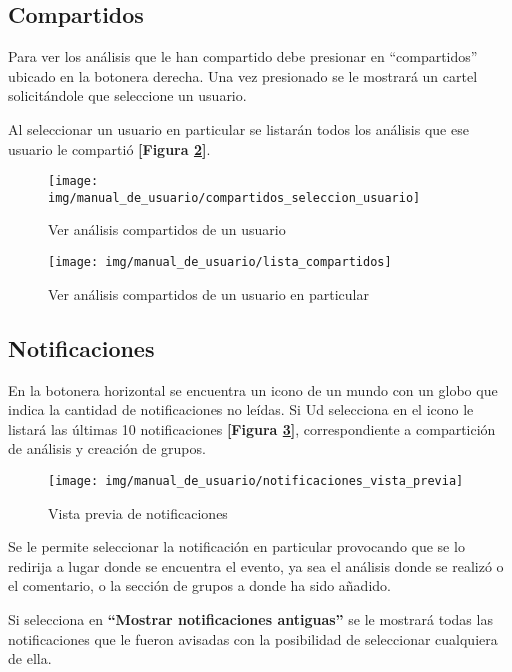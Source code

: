\subsection{Compartidos} \label{compartidos}
Para ver los análisis que le han compartido debe presionar en ``compartidos'' ubicado en la botonera derecha. Una vez presionado se le mostrará un cartel solicitándole que seleccione un usuario. 

Al seleccionar un usuario en particular se listarán todos los análisis que ese usuario le compartió \textbf{[Figura \ref{mu-lista_compartidos}]}.
\begin{figure}
	\centering
	\texttt{[image: img/manual\_de\_usuario/compartidos\_seleccion\_usuario]}
	\caption{Ver análisis compartidos de un usuario}
	\label{mu-compartidos_seleccion_usuario}
\end{figure}


\begin{figure}
	\centering
	\texttt{[image: img/manual\_de\_usuario/lista\_compartidos]}
	\caption{Ver análisis compartidos de un usuario en particular}
	\label{mu-lista_compartidos}
\end{figure}









\subsection{Notificaciones}
En la botonera horizontal se encuentra un icono de un mundo con un globo que indica la cantidad de notificaciones no leídas. Si Ud selecciona en el icono le listará las últimas 10 notificaciones \textbf{[Figura \ref{mu-notificaciones_vista_previa}]}, correspondiente a compartición de análisis y creación de grupos. 
\begin{figure}
	\centering
	\texttt{[image: img/manual\_de\_usuario/notificaciones\_vista\_previa]}
	\caption{Vista previa de notificaciones}
	\label{mu-notificaciones_vista_previa}
\end{figure}
Se le permite seleccionar la notificación en particular provocando que se lo redirija a lugar donde se encuentra el evento, ya sea el análisis donde se realizó o el comentario, o la sección de grupos a donde ha sido añadido.

Si selecciona en \textbf{``Mostrar notificaciones antiguas''} se le mostrará todas las notificaciones que le fueron avisadas con la posibilidad de seleccionar cualquiera de ella.


